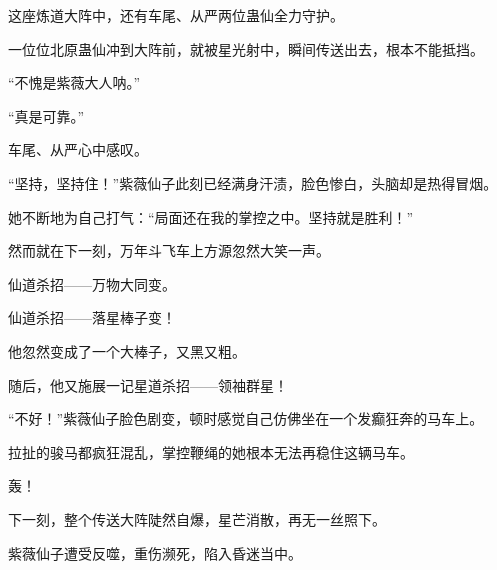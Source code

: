 \begin{this_body}
这座炼道大阵中，还有车尾、从严两位蛊仙全力守护。

一位位北原蛊仙冲到大阵前，就被星光射中，瞬间传送出去，根本不能抵挡。

“不愧是紫薇大人呐。”

“真是可靠。”

车尾、从严心中感叹。

“坚持，坚持住！”紫薇仙子此刻已经满身汗渍，脸色惨白，头脑却是热得冒烟。

她不断地为自己打气：“局面还在我的掌控之中。坚持就是胜利！”

然而就在下一刻，万年斗飞车上方源忽然大笑一声。

仙道杀招——万物大同变。

仙道杀招——落星棒子变！

他忽然变成了一个大棒子，又黑又粗。

随后，他又施展一记星道杀招——领袖群星！

“不好！”紫薇仙子脸色剧变，顿时感觉自己仿佛坐在一个发癫狂奔的马车上。

拉扯的骏马都疯狂混乱，掌控鞭绳的她根本无法再稳住这辆马车。

轰！

下一刻，整个传送大阵陡然自爆，星芒消散，再无一丝照下。

紫薇仙子遭受反噬，重伤濒死，陷入昏迷当中。

\end{this_body}


